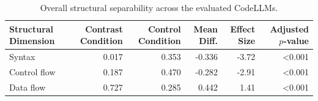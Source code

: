 \begin{table}[t]
\centering
\caption{Overall structural separability across the evaluated CodeLLMs.}
\label{tab:sep}
\begin{tabular}{lrrrrr}
\toprule
Structural Dimension & Contrast Condition & Control Condition & Mean Diff. & Effect Size & Adjusted $p$-value \\
\midrule
Syntax & 0.017 & 0.353 & -0.336 & -3.72 & \textless{}0.001 \\
Control flow & 0.187 & 0.470 & -0.282 & -2.91 & \textless{}0.001 \\
Data flow & 0.727 & 0.285 & 0.442 & 1.41 & \textless{}0.001 \\
\bottomrule
\end{tabular}
\end{table}

